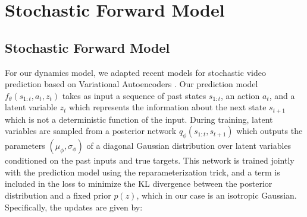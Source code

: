 \documentclass{article} %
\begin{document}








\section{Stochastic Forward Model}

\subsection{Stochastic Forward Model}

For our dynamics model, we adapted recent models for stochastic video prediction \citep{Babaeizadeh2018, Denton2018} based on Variational Autoencoders \citep{VAE}.
Our prediction model $f_\theta(s_{1:t}, a_t, z_t)$ takes as input a sequence of past states $s_{1:t}$, an action $a_t$, and a latent variable $z_t$ which represents the information about the next state $s_{t+1}$ which is not a deterministic function of the input.
During training, latent variables are sampled from a posterior network $q_\phi(s_{1:t}, s_{t+1})$ which outputs the parameters $(\mu_\phi, \sigma_\phi)$ of a diagonal Gaussian distribution over latent variables conditioned on the past inputs and true targets. This network is trained jointly with the prediction model using the reparameterization trick, and a term is included in the loss to minimize the KL divergence between the posterior distribution and a fixed prior $p(z)$, which in our case is an isotropic Gaussian.
Specifically, the updates are given by:
\end{document}
